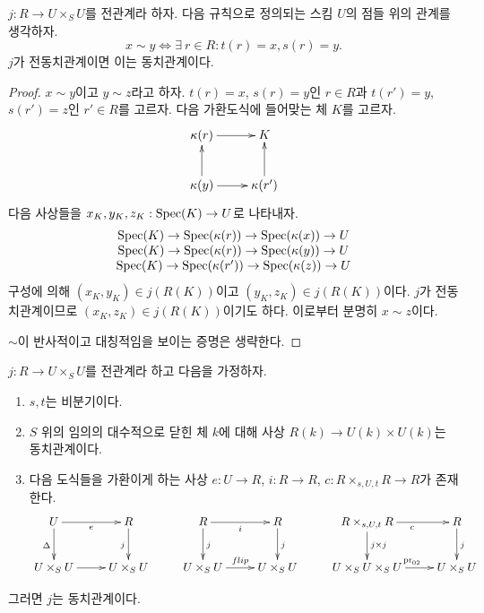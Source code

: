 \begin{lemma}
\label{lemma-pre-equivalence-equivalence-relation-points}
$j : R \to U \times_S U$를 전관계라 하자.
다음 규칙으로 정의되는 스킴 $U$의 점들 위의 관계를 생각하자.
$$
x \sim y
\Leftrightarrow
\exists\ r \in R :
t(r) = x,
s(r) = y.
$$
$j$가 전동치관계이면 이는 동치관계이다.
\end{lemma}

\begin{proof}
$x \sim y$이고 $y \sim z$라고 하자.
$t(r) = x$, $s(r) = y$인 $r \in R$과
$t(r') = y$, $s(r') = z$인 $r' \in R$를 고르자.
다음 가환도식에 들어맞는 체 $K$를 고르자.
$$
\xymatrix{
\kappa(r) \ar[r] & K \\
\kappa(y) \ar[u] \ar[r] & \kappa(r') \ar[u]
}
$$
다음 사상들을 $x_K, y_K, z_K : \mathop{\mathrm{Spec}}(K) \to U$로 나타내자.
$$
\begin{matrix}
\mathop{\mathrm{Spec}}(K) \to \mathop{\mathrm{Spec}}(\kappa(r))
\to
\mathop{\mathrm{Spec}}(\kappa(x)) \to U \\
\mathop{\mathrm{Spec}}(K) \to \mathop{\mathrm{Spec}}(\kappa(r))
\to
\mathop{\mathrm{Spec}}(\kappa(y)) \to U \\
\mathop{\mathrm{Spec}}(K) \to \mathop{\mathrm{Spec}}(\kappa(r'))
\to
\mathop{\mathrm{Spec}}(\kappa(z)) \to U
\end{matrix}
$$
구성에 의해 $(x_K, y_K) \in j(R(K))$이고
$(y_K, z_K) \in j(R(K))$이다. $j$가 전동치관계이므로
$(x_K, z_K) \in j(R(K))$이기도 하다. 이로부터 분명히 $x \sim z$이다.

\medskip\noindent
$\sim$이 반사적이고 대칭적임을 보이는 증명은 생략한다.
\end{proof}

\begin{lemma}
\label{lemma-etale-equivalence-relation}
$j : R \to U \times_S U$를 전관계라 하고 다음을 가정하자.
\begin{enumerate}
\item $s, t$는 비분기이다.
\item $S$ 위의 임의의 대수적으로 닫힌 체 $k$에 대해 사상
$R(k) \to U(k) \times U(k)$는 동치관계이다.
\item 다음 도식들을 가환이게 하는 사상
$e : U \to R$, $i : R \to R$,
$c : R \times_{s, U, t} R \to R$가 존재한다.
$$
\xymatrix{
U \ar[r]_e \ar[d]_\Delta &
R \ar[d]_j &
R \ar[d]^j \ar[r]_i &
R \ar[d]^j &
R \times_{s, U, t} R \ar[d]^{j \times j} \ar[r]_c &
R \ar[d]^j \\
U \times_S U \ar[r] &
U \times_S U &
U \times_S U \ar[r]^{flip} &
U \times_S U &
U \times_S U \times_S U \ar[r]^{\text{pr}_{02}} &
U \times_S U
}
$$
\end{enumerate}
그러면 $j$는 동치관계이다.
\end{lemma}

